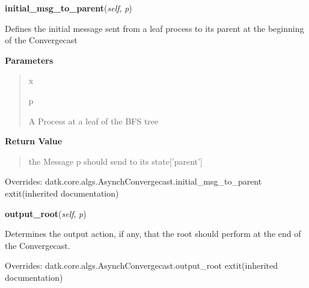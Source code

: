 \hspace{.8\funcindent}\begin{boxedminipage}{\funcwidth}

    \raggedright \textbf{initial\_msg\_to\_parent}(\textit{self}, \textit{p})

\setlength{\parskip}{2ex}
    Defines the initial message sent from a leaf process to its parent at 
    the beginning of the Convergecast

\setlength{\parskip}{1ex}
      \textbf{Parameters}
      \vspace{-1ex}

      \begin{quote}
        \begin{Ventry}{x}

          \item[p]

          A Process at a leaf of the BFS tree

        \end{Ventry}

      \end{quote}

      \textbf{Return Value}
    \vspace{-1ex}

      \begin{quote}
      the Message p should send to its state['parent']

      \end{quote}

      Overrides: datk.core.algs.AsynchConvergecast.initial\_msg\_to\_parent 	extit{(inherited documentation)}

    \end{boxedminipage}

    \vspace{0.5ex}

\hspace{.8\funcindent}\begin{boxedminipage}{\funcwidth}

    \raggedright \textbf{output\_root}(\textit{self}, \textit{p})

\setlength{\parskip}{2ex}
    Determines the output action, if any, that the root should perform at 
    the end of the Convergecast.

\setlength{\parskip}{1ex}
      Overrides: datk.core.algs.AsynchConvergecast.output\_root 	extit{(inherited documentation)}

    \end{boxedminipage}

